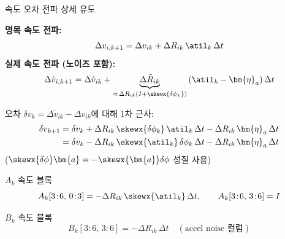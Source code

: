 \begin{frame}[shrink=10]{속도 오차 전파 상세 유도}

  \textbf{명목 속도 전파:}
  \[
    \Delta v_{i,k+1} = \Delta v_{ik} + \Delta R_{ik}\,\atil_k\,\Delta t
  \]
  \textbf{실제 속도 전파 (노이즈 포함):}
  \[
    \Delta\tilde{v}_{i,k+1}
    = \Delta\tilde{v}_{ik}
      + \underbrace{\Delta\tilde{R}_{ik}}_{\approx\,\Delta R_{ik}(I+\skewx{\delta\phi_k})}
      \,(\atil_k - \bm{\eta}_a)\,\Delta t
  \]

  \pause
  오차 $\delta v_k = \Delta\tilde{v}_{ik} - \Delta v_{ik}$에 대해 1차 근사:
  \begin{align*}
    \delta v_{k+1}
    &= \delta v_k
      + \Delta R_{ik}\,\skewx{\delta\phi_k}\,\atil_k\,\Delta t
      - \Delta R_{ik}\,\bm{\eta}_a\,\Delta t \\
    &= \delta v_k
      - \Delta R_{ik}\,\skewx{\atil_k}\,\delta\phi_k\,\Delta t
      - \Delta R_{ik}\,\bm{\eta}_a\,\Delta t
  \end{align*}
  ($\skewx{\delta\phi}\bm{a} = -\skewx{\bm{a}}\delta\phi$ 성질 사용)

  \pause
  \begin{block}{$A_k$ 속도 블록}
    \[
      A_k[3\!:\!6,\, 0\!:\!3] = -\Delta R_{ik}\,\skewx{\atil_k}\,\Delta t,
      \qquad
      A_k[3\!:\!6,\, 3\!:\!6] = I
    \]
  \end{block}

  \begin{block}{$B_k$ 속도 블록}
    \[
      B_k[3\!:\!6,\, 3\!:\!6] = -\Delta R_{ik}\,\Delta t
      \quad (\text{accel noise 컬럼})
    \]
  \end{block}
\end{frame}

